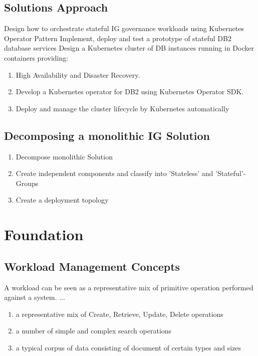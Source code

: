 \documentclass[runningheads]{llncs}
\begin{document}
\subsection{ Solutions Approach}

Design how to orchestrate stateful IG governance workloads using Kubernetes Operator Pattern Implement, deploy and test a prototype of stateful DB2 database services Design a Kubernetes cluster of DB instances running in Docker containers providing:

\begin{enumerate}
    \item High Availability and Disaster Recovery. 
    \item Develop a Kubernetes operator for DB2 using Kubernetes Operator SDK. 
    \item Deploy and manage the cluster lifecycle by Kubernetes automatically
\end{enumerate}


\subsection{ Decomposing a monolithic IG Solution  }

\begin{enumerate}
    \item Decompose monolithic Solution
    \item Create independent components and classify into 'Stateless' and 'Stateful'-Groups 
    \item Create a deployment topology 
\end{enumerate}

\section{Foundation}

\subsection{Workload Management Concepts}
A workload can be seen as a representative mix of primitive operation performed against a system. 
...
\begin{enumerate}
    \item a representative mix of Create, Retrieve, Update, Delete operations 
    \item a number of simple and complex search operations
    \item a typical corpus of data consisting of document of certain types and sizes
\end{enumerate}
\end{document}
